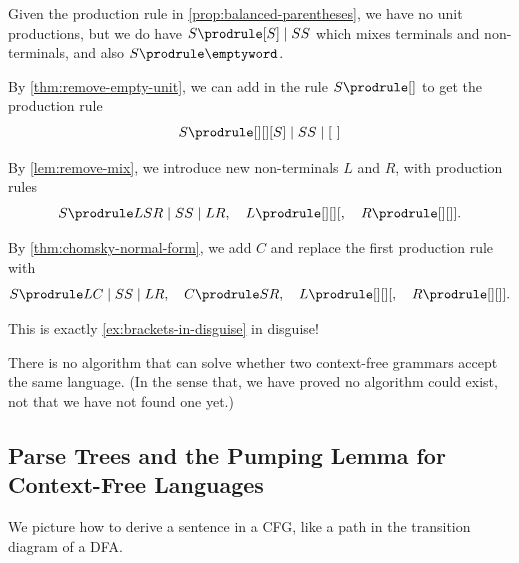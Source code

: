 \begin{example}
    \label{ex:balanced-parentheses-revisited}%
    Given the production rule in \autoref{prop:balanced-parentheses}, we have no unit productions, but we do have \(S \prodrule [S] \mid SS\) which mixes terminals and non-terminals, and also \(S \prodrule \emptyword\).

    By \autoref{thm:remove-empty-unit}, we can add in the rule \(S \prodrule []\) to get the production rule
    \[
        S \prodrule[][] [S] \mid SS \mid [\ ]
    \]

    By \autoref{lem:remove-mix}, we introduce new non-terminals \(L\) and \(R\), with production rules
    \[
        S \prodrule LSR \mid SS \mid LR, \quad L \prodrule[][] [, \quad R \prodrule[][] ].
    \]

    By \autoref{thm:chomsky-normal-form}, we add \(C\) and replace the first production rule with
    \[
        S \prodrule LC \mid SS \mid LR, \quad C \prodrule SR, \quad L \prodrule[][] [, \quad R \prodrule[][] ].
    \]

    This is exactly \autoref{ex:brackets-in-disguise} in disguise!
\end{example}

\small
\begin{remark}
    There is no algorithm that can solve whether two context-free grammars accept the same language. (In the sense that, we have proved no algorithm could exist, not that we have not found one yet.)
\end{remark}
\normalsize

\subsection{Parse Trees and the Pumping Lemma for Context-Free Languages}

We picture how to derive a sentence in a CFG, like a path in the transition diagram of a DFA.

